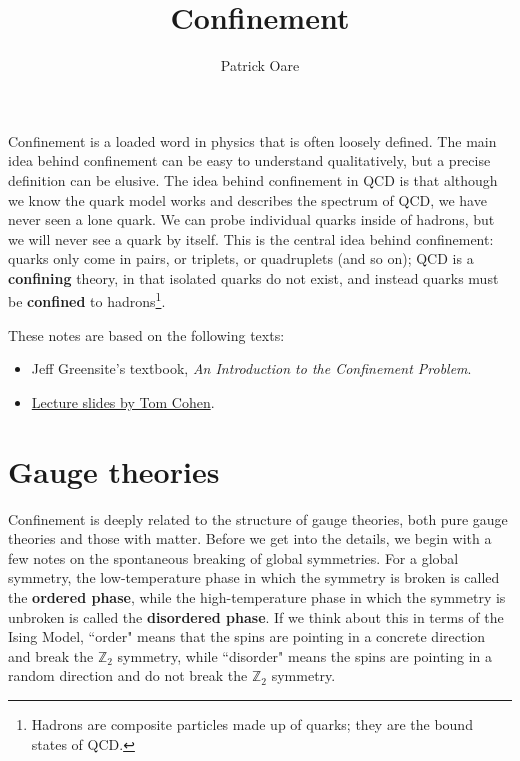 \def \root {../..}			%


\title{Confinement}
\author{Patrick Oare}
\date{}							%


\maketitle

Confinement is a loaded word in physics that is often loosely defined. The main idea behind confinement can be easy to understand qualitatively, but a precise definition can be elusive. The idea behind confinement in QCD is that although we know the quark model works and describes the spectrum of QCD, we have never seen a lone quark. We can probe individual quarks inside of hadrons, but we will never see a quark by itself. This is the central idea behind confinement: quarks only come in pairs, or triplets, or quadruplets (and so on); QCD is a \textbf{confining} theory, in that isolated quarks do not exist, and instead quarks must be \textbf{confined} to hadrons\footnote{Hadrons are composite particles made up of quarks; they are the bound states of QCD.}. 


\begin{resources}
These notes are based on the following texts:
\begin{itemize}
	\item Jeff Greensite's textbook, \textit{An Introduction to the Confinement Problem}. 
	\item \href{https://indico.cern.ch/event/195077/contributions/1473970/attachments/283795/396817/PolyakovLoopCohen.pdf}{Lecture slides by Tom Cohen}. 
\end{itemize}
\end{resources}

\newpage
\section{Gauge theories}

Confinement is deeply related to the structure of gauge theories, both pure gauge theories and those with matter. Before we get into the details, we begin with a few notes on the spontaneous breaking of global symmetries. For a global symmetry, the low-temperature phase in which the symmetry is broken is called the \textbf{ordered phase}, while the high-temperature phase in which the symmetry is unbroken is called the \textbf{disordered phase}. If we think about this in terms of the Ising Model, ``order" means that the spins are pointing in a concrete direction and break the $\mathbb Z_2$ symmetry, while ``disorder" means the spins are pointing in a random direction and do not break the $\mathbb Z_2$ symmetry. 

